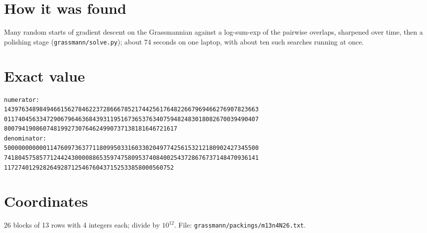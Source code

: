 \documentclass[11pt,a4paper]{article}
\begin{document}
\section{How it was found}
Many random starts of gradient descent on the Grassmannian against a log-sum-exp of the pairwise overlaps, sharpened over time, then a polishing stage (\texttt{grassmann/solve.py}); about 74 seconds on one laptop, with about ten such searches running at once.


\appendix
\section{Exact value}
{\small
\begin{verbatim}
numerator:
143976348984946615627846223728666785217442561764822667969466276907823663
011740456334729067964636843931195167365376340759482483018082670039490407
8007941908607481992730764624990737138181646721617
denominator:
500000000000114760973637711809950331603302049774256153212180902427345500
741804575857712442430000886535974758095374084002543728676737148470936141
117274012928264928712546760437152533858000560752
\end{verbatim}}

\section{Coordinates}
26 blocks of 13 rows with 4 integers each; divide by $10^{12}$. File: \texttt{grassmann/packings/m13n4N26.txt}.
{\tiny
\begin{multicols}{3}
\end{multicols}}
\end{document}
